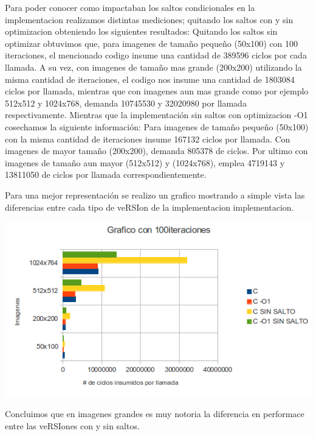  Para poder conocer como impactaban los saltos condicionales en la implementacion realizamos distintas mediciones;
 quitando los saltos con y sin optimizacion obteniendo los siguientes resultados:
 Quitando los saltos sin optimizar obtuvimos que, para imagenes de tamaño pequeño (50x100) con 100 iteraciones, el mencionado codigo insume
 una cantidad de 389596 ciclos por cada llamada. A su vez, con imagenes de tamaño mas grande (200x200) utilizando la misma cantidad de iteraciones,
 el codigo nos insume  una cantidad de 1803084 ciclos por llamada, mientras que con imagenes aun mas grande como por ejemplo 512x512 y 1024x768, demanda
 10745530 y 32020980 por llamada respectivamente.
 \vspace*{0.3cm} 
 Mientras que la implementación sin saltos con optimizacion -O1 cosechamos la siguiente información:
 Para imagenes de tamaño pequeño (50x100) con la misma cantidad de iteraciones insume 167132 ciclos por llamada. 
 Con imagenes de mayor tamaño (200x200), demanda 805378 de ciclos.
 Por ultimo con imagenes de tamaño aun mayor (512x512) y (1024x768), emplea 4719143 y 13811050 de ciclos por llamada correspondientemente.
  \vspace*{0.3cm}
 
  Para una mejor representación se realizo un grafico mostrando a simple vista
  las diferencias entre cada tipo de veRSIon de la implementacion implementacion.
 \vspace*{0.3cm} \vspace*{0.3cm}
  \begin{center}
 \includegraphics[scale=0.7]{popartbien.png}
 \end{center}
  \vspace*{0.3cm} 

  Concluimos que en imagenes grandes es muy notoria la diferencia en performace entre las veRSIones con y sin saltos.

